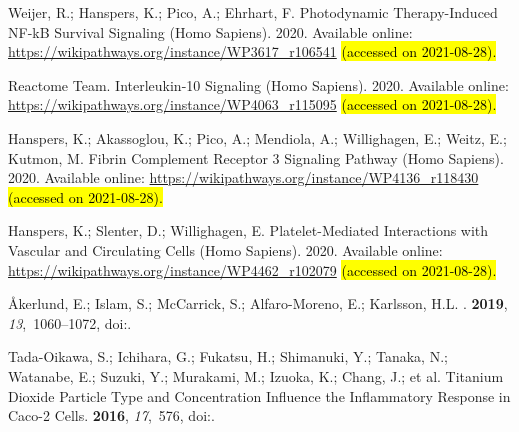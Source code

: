 \documentclass[ijms,article,accept,moreauthors,pdftex]{Definitions/mdpi}
\begin{document}
\begin{thebibliography}{999}
Weijer, R.; Hanspers, K.; Pico, A.; Ehrhart, F.
\newblock Photodynamic Therapy-Induced NF-kB Survival Signaling (Homo Sapiens). 2020.
\newblock Available online: \url{https://wikipathways.org/instance/WP3617_r106541} \hl{(accessed on 2021-08-28). } %

{Reactome Team}.
\newblock Interleukin-10 Signaling (Homo Sapiens). 2020.
\newblock Available online: \url{https://wikipathways.org/instance/WP4063_r115095} \hl{(accessed on 2021-08-28). } %

Hanspers, K.; Akassoglou, K.; Pico, A.; Mendiola, A.; Willighagen, E.; Weitz,
  E.; Kutmon, M.
\newblock Fibrin Complement Receptor 3 Signaling Pathway (Homo Sapiens). 2020.
\newblock Available online: \url{https://wikipathways.org/instance/WP4136_r118430} \hl{(accessed on 2021-08-28).} %

Hanspers, K.; Slenter, D.; Willighagen, E.
\newblock Platelet-Mediated Interactions with Vascular and Circulating Cells
  (Homo Sapiens). 2020.
\newblock Available online: \url{https://wikipathways.org/instance/WP4462_r102079} \hl{(accessed on 2021-08-28). } %

{\AA}kerlund, E.; Islam, S.; McCarrick, S.; Alfaro-Moreno, E.; Karlsson, H.L.
.
 {\bf 2019}, {\em 13},~1060--1072,
\newblock
  doi:{\href{https://doi.org/10.1080/17435390.2019.1640908}{}}.

Tada-Oikawa, S.; Ichihara, G.; Fukatsu, H.; Shimanuki, Y.; Tanaka, N.;
  Watanabe, E.; Suzuki, Y.; Murakami, M.; Izuoka, K.; Chang, J.; et al.
\newblock Titanium Dioxide Particle Type and Concentration Influence the
  Inflammatory Response in Caco-2 Cells.
 {\bf 2016}, {\em
  17},~576,
\newblock
  doi:{\href{https://doi.org/10.3390/ijms17040576}{}}.


\end{thebibliography}
\end{document}
